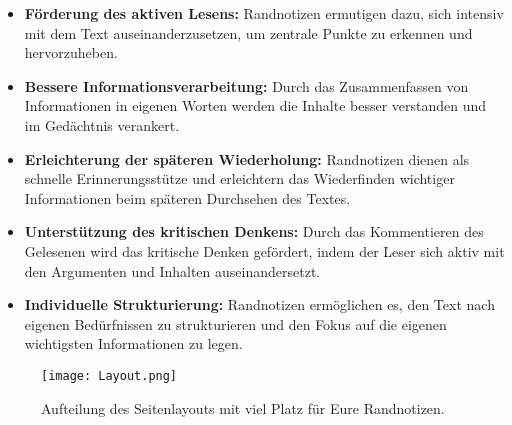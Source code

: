 \documentclass[11pt,a4paper]{book}
\begin{document}
\begin{itemize}
\item \textbf{F\"{o}rderung des aktiven Lesens:} Randnotizen ermutigen dazu, sich intensiv mit dem Text auseinanderzusetzen, um zentrale Punkte zu erkennen und hervorzuheben.

\item \textbf{Bessere Informationsverarbeitung:} Durch das Zusammenfassen von Informationen in eigenen Worten werden die Inhalte besser verstanden und im Ged\"{a}chtnis verankert.

\item \textbf{Erleichterung der sp\"{a}teren Wiederholung:} Randnotizen dienen als schnelle Erinnerungsst\"{u}tze und erleichtern das Wiederfinden wichtiger Informationen beim sp\"{a}teren Durchsehen des Textes.

\item \textbf{Unterst\"{u}tzung des kritischen Denkens:} Durch das Kommentieren des Gelesenen wird das kritische Denken gef\"{o}rdert, indem der Leser sich aktiv mit den Argumenten und Inhalten auseinandersetzt.

\item \textbf{Individuelle Strukturierung:} Randnotizen erm\"{o}glichen es, den Text nach eigenen Bed\"{u}rfnissen zu strukturieren und den Fokus auf die eigenen wichtigsten Informationen zu legen.
\end{itemize}

\vs{1cm}
\begin{figure}[h]
	\centering
	\texttt{[image: Layout.png]}
	\caption{Aufteilung des Seitenlayouts mit viel Platz f\"{u}r Eure Randnotizen.}
	\label{fig:Seitenlayout}
\end{figure}


\tableofcontents
\newpage

\restoregeometry %




















\printbibliography


\end{document}
